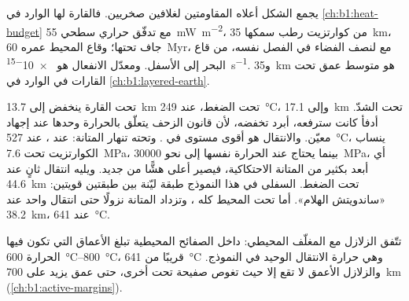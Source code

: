 يجمع الشكل أعلاه المقاومتين لغلافين صخريين. فالقارة لها  الوارد في \cref{ch:b1:heat-budget} مع تدفّق حراري سطحي \qty{55}{mW.m^{-2}}،  من كوارتزيت رطب سمكها \qty{35}{km}،  جاف تحتها؛ وقاع المحيط عمره \qty{60}{Myr}، مع  لنصف الفضاء في الفصل نفسه،  من قاع البحر إلى الأسفل. ومعدّل الانفعال هو \qty{e-15}{s^{-1}}. و\qty{35}{km} هو متوسط عمق  تحت القارات في  الوارد في \cref{ch:b1:layered-earth}.

تحت القارة ينخفض  إلى \qty{13.7}{km} تحت الضغط، عند \qty{249}{\degreeCelsius}، وإلى \qty{17.1}{km} تحت الشدّ.  أدفأ كانت سترفعه،  أبرد تخفضه، لأن قانون الزحف يتعلّق بالحرارة وحدها عند إجهاد معيّن. والانتقال هو أقوى مستوى في .
وتحته تنهار المتانة: عند ، عند \qty{527}{\degreeCelsius}، ينساب الكوارتزيت تحت \qty{7.6}{MPa}، بينما يحتاج  عند الحرارة نفسها إلى نحو \qty{30000}{MPa}، أي أبعد بكثير من المتانة الاحتكاكية، فيصير أعلى  هشًّا من جديد. ويليه انتقال ثانٍ عند \qty{44.6}{km} تحت الضغط.  السفلى في هذا النموذج طبقة ليّنة بين طبقتين قويتين: «ساندويتش الهلام». أما تحت المحيط  كله ، وتزداد المتانة نزولًا حتى انتقال واحد عند \qty{38.2}{km}، عند \qty{641}{\degreeCelsius}.

تتّفق الزلازل مع المغلّف المحيطي: داخل الصفائح المحيطية تبلغ الأعماق التي تكون فيها الحرارة \qtyrange{600}{800}{\degreeCelsius}، قريبًا من \qty{641}{\degreeCelsius} وهي حرارة الانتقال الوحيد في النموذج. والزلازل الأعمق لا تقع إلا حيث تغوص صفيحة تحت أخرى، حتى عمق يزيد على \qty{700}{km} (\cref{ch:b1:active-margins}).

